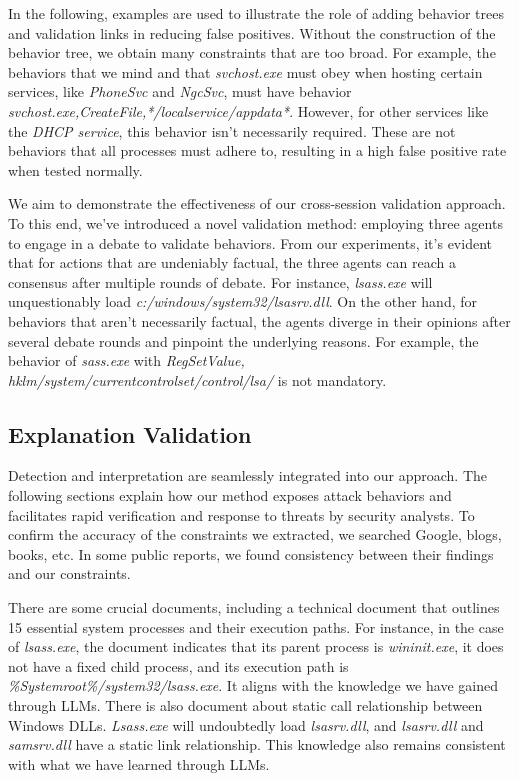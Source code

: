 In the following, examples are used to illustrate the role of adding behavior trees and validation links in reducing false positives.
Without the construction of the behavior tree, we obtain many constraints that are too broad.
For example, the behaviors that we mind and that \textit{svchost.exe} must obey when hosting certain services, like \textit{PhoneSvc} and \textit{NgcSvc}, must have behavior \textit{svchost.exe,CreateFile,*/localservice/appdata*}. However, for other services like the \textit{DHCP service}, this behavior isn't necessarily required.
These are not behaviors that all processes must adhere to, resulting in a high false positive rate when tested normally. 

We aim to demonstrate the effectiveness of our cross-session validation approach. To this end, we've introduced a novel validation method: employing three agents to engage in a debate to validate behaviors. From our experiments, it's evident that for actions that are undeniably factual, the three agents can reach a consensus after multiple rounds of debate. For instance, \textit{lsass.exe} will unquestionably load \textit{c:/windows/system32/lsasrv.dll}. On the other hand, for behaviors that aren't necessarily factual, the agents diverge in their opinions after several debate rounds and pinpoint the underlying reasons. For example, the behavior of \textit{sass.exe} with \textit{RegSetValue, hklm/system/currentcontrolset/control/lsa/} is not mandatory.



\subsection{Explanation Validation}
\label{sec-explanation-val}

Detection and interpretation are seamlessly integrated into our approach. The following sections explain how our method exposes attack behaviors and facilitates rapid verification and response to threats by security analysts.
To confirm the accuracy of the constraints we extracted, we searched Google, blogs, books, etc. In some public reports, we found consistency between their findings and our constraints.

There are some crucial documents\cite{nasbench}, including a technical document that outlines 15 essential system processes and their execution paths. For instance, in the case of \textit{lsass.exe}, the document indicates that its parent process is \textit{wininit.exe}, it does not have a fixed child process, and its execution path is \textit{\%Systemroot\%/system32/lsass.exe}. It aligns with the knowledge we have gained through LLMs.
There is also document\cite{windows10dll} about static call relationship between Windows DLLs. \textit{Lsass.exe} will undoubtedly load \textit{lsasrv.dll}, and \textit{lsasrv.dll} and \textit{samsrv.dll} have a static link relationship. This knowledge also remains consistent with what we have learned through LLMs.

